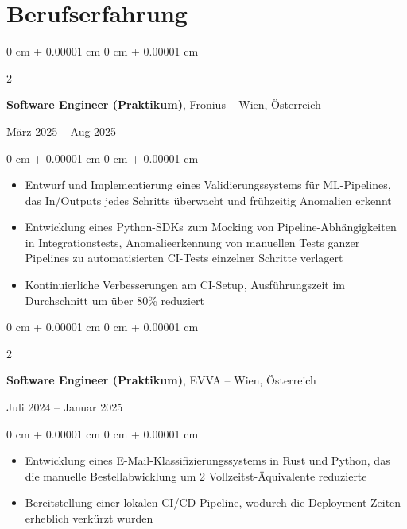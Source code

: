 \documentclass[10pt, letterpaper]{article}
\newenvironment{highlights}{
    \begin{itemize}[
        topsep=0.10 cm,
        parsep=0.10 cm,
        partopsep=0pt,
        itemsep=0pt,
        leftmargin=0 cm + 10pt
    ]
}{
    \end{itemize}
}
\newenvironment{onecolentry}{
    \begin{adjustwidth}{
        0 cm + 0.00001 cm
    }{
        0 cm + 0.00001 cm
    }
}{
    \end{adjustwidth}
}
\newenvironment{twocolentry}[2][]{
    \onecolentry
    \def\secondColumn{#2}
    \setcolumnwidth{\fill, 4.5 cm}
    \begin{paracol}{2}
}{
    \switchcolumn \raggedleft \secondColumn
    \end{paracol}
    \endonecolentry
}
\begin{document}
    \section{Berufserfahrung}
        
    \begin{twocolentry}
        {März 2025 – Aug 2025}
        \textbf{Software Engineer (Praktikum)}, Fronius -- Wien, Österreich
    \end{twocolentry}

    \vspace{0.10 cm}
    
    \begin{onecolentry}
        \begin{highlights}
            \item Entwurf und Implementierung eines Validierungssystems für ML-Pipelines, das In/Outputs jedes Schritts überwacht und frühzeitig Anomalien erkennt
            \item Entwicklung eines Python-SDKs zum Mocking von Pipeline-Abhängigkeiten in Integrationstests, Anomalieerkennung von manuellen Tests ganzer Pipelines zu automatisierten CI-Tests einzelner Schritte verlagert
            \item Kontinuierliche Verbesserungen am CI-Setup, Ausführungszeit im Durchschnitt um über 80\% reduziert
        \end{highlights}
    \end{onecolentry}

    \vspace{0.2 cm}

    \begin{twocolentry}
        {Juli 2024 – Januar 2025}
        \textbf{Software Engineer (Praktikum)}, EVVA -- Wien, Österreich
    \end{twocolentry}

    \vspace{0.10 cm}
    
    \begin{onecolentry}
        \begin{highlights}
            \item Entwicklung eines E-Mail-Klassifizierungssystems in Rust und Python, das die manuelle Bestellabwicklung um 2 Vollzeitst-Äquivalente reduzierte
            \item Bereitstellung einer lokalen CI/CD-Pipeline, wodurch die Deployment-Zeiten erheblich verkürzt wurden
        \end{highlights}
    \end{onecolentry}
\end{document}
